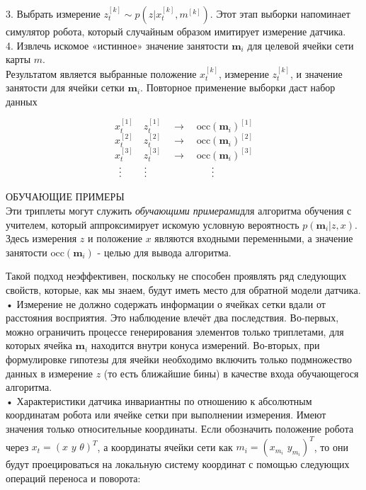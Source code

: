 \documentclass[10pt,a4paper]{article}
\begin{document}
3.	Выбрать измерение $z_t^{[k]}\sim p(z|x_t^{[k]},m^{[k]})$. Этот этап выборки напоминает симулятор робота, который случайным образом имитирует измерение датчика.\\

4.	Извлечь искомое «истинное» значение занятости $\textbf{m}_i$ для целевой ячейки сети карты $m$.\\

Результатом является выбранные положение $x_t^{[k]}$, измерение $z_t^{[k]}$, и значение занятости для ячейки сетки $\textbf{m}_i$. Повторное применение выборки даст набор данных

$$x_t^{[1]}\quad z_t^{[1]}\quad\longrightarrow\quad\text{occ}(\textbf{m}_i)^{[1]}$$
$$x_t^{[2]}\quad z_t^{[2]}\quad\longrightarrow\quad\text{occ}(\textbf{m}_i)^{[2]}$$
$$x_t^{[3]}\quad z_t^{[3]}\quad\longrightarrow\quad\text{occ}(\textbf{m}_i)^{[3]}$$
$\hspace{40mm}\vdots\hspace{8mm}\vdots\hspace{23mm}\vdots$

ОБУЧАЮЩИЕ ПРИМЕРЫ\\

Эти триплеты могут служить \textit{обучающими примерами}для алгоритма обучения с учителем, который аппроксимирует искомую условную вероятность $p(\textbf{m}_i|z,x)$. Здесь измерения $z$ и положение $x$ являются входными переменными, а значение занятости $\text{occ}(\textbf{m}_i)$ - целью для вывода алгоритма.

Такой подход неэффективен, поскольку не способен проявлять ряд следующих свойств, которые, как мы знаем, будут иметь место для обратной модели датчика.\\

•	Измерение не должно содержать информации о ячейках сетки вдали от расстояния восприятия. Это наблюдение влечёт два последствия. Во-первых, можно ограничить процессе генерирования элементов только триплетами, для которых ячейка $\textbf{m}_i$ находится внутри конуса измерений. Во-вторых, при формулировке гипотезы для ячейки необходимо включить только подмножество данных в измерение $z$ (то есть ближайшие бины) в качестве входа обучающегося алгоритма.\\

•	Характеристики датчика инвариантны по отношению к абсолютным координатам робота или ячейке сетки при выполнении измерения. Имеют значения только относительные координаты. Если обозначить положение робота через $x_t=(x\,\,y\,\,\theta)^T$, а координаты ячейки сети как $m_i=(x_{m_i}\,\,y_{m_i})^T$, то они будут проецироваться на локальную систему координат с помощью следующих операций переноса и поворота:\\
\end{document}
